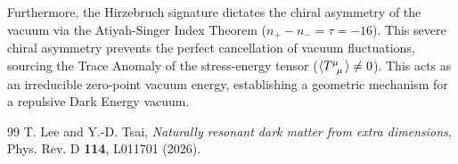 \documentclass[aps,prd,twocolumn,nofootinbib,superscriptaddress,10pt]{revtex4-2}
\begin{document}
Furthermore, the Hirzebruch signature dictates the chiral asymmetry of the vacuum via the Atiyah-Singer Index Theorem ($n_+ - n_- = \tau = -16$). This severe chiral asymmetry prevents the perfect cancellation of vacuum fluctuations, sourcing the Trace Anomaly of the stress-energy tensor ($\langle \tensor{T}{^\mu_\mu} \rangle \neq 0$). This acts as an irreducible zero-point vacuum energy, establishing a geometric mechanism for a repulsive Dark Energy vacuum.

\begin{thebibliography}{99}
 T. Lee and Y.-D. Tsai, \textit{Naturally resonant dark matter from extra dimensions}, Phys. Rev. D \textbf{114}, L011701 (2026).
\end{thebibliography}
\end{document}
